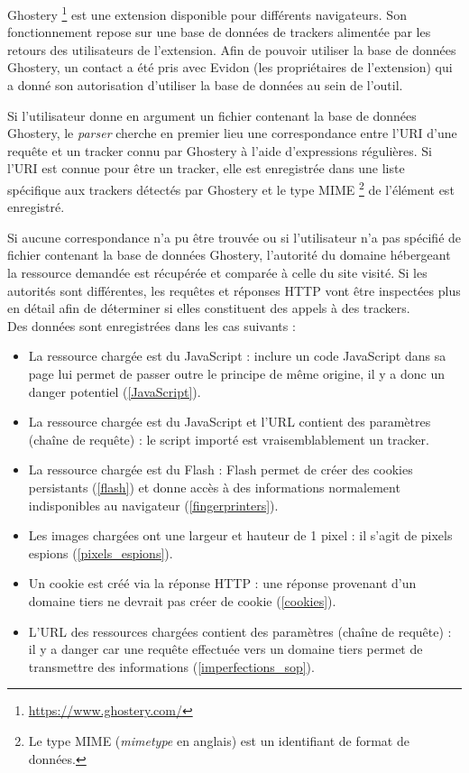 Ghostery \footnote{\url{https://www.ghostery.com/}} est une extension disponible pour différents navigateurs. Son fonctionnement repose sur une base de données de trackers alimentée par les retours des utilisateurs de l'extension.
Afin de pouvoir utiliser la base de données Ghostery, un contact a été pris avec Evidon (les propriétaires de l'extension) qui a donné son autorisation d'utiliser la base de données au sein de l'outil.
\newline

Si l'utilisateur donne en argument un fichier contenant la base de données Ghostery, le \textit{parser} cherche en premier lieu une correspondance entre l'URI d'une requête et un tracker connu par Ghostery à l'aide d'expressions régulières. Si l'URI est connue pour être un tracker, elle est enregistrée dans une liste spécifique aux trackers détectés par Ghostery et le type MIME \footnote{Le type MIME (\textit{mimetype} en anglais) est un identifiant de format de données.} de l'élément est enregistré.

Si aucune correspondance n'a pu être trouvée ou si l'utilisateur n'a pas spécifié de fichier contenant la base de données Ghostery, l'autorité du domaine hébergeant la ressource demandée est récupérée et comparée à celle du site visité. Si les autorités sont différentes, les requêtes et réponses HTTP vont être inspectées plus en détail afin de déterminer si elles constituent des appels à des trackers.\\
Des données sont enregistrées dans les cas suivants :
\begin{itemize}
	\item La ressource chargée est du JavaScript : inclure un code JavaScript dans sa page lui permet de passer outre le principe de même origine, il y a donc un danger potentiel (\autoref{JavaScript}).
	\item La ressource chargée est du JavaScript et l'URL contient des paramètres (chaîne de requête) : le script importé est vraisemblablement un tracker.
	\item La ressource chargée est du Flash : Flash permet de créer des cookies persistants (\autoref{flash}) et donne accès à des informations normalement indisponibles au navigateur (\autoref{fingerprinters}).
	\item Les images chargées ont une largeur et hauteur de 1 pixel : il s'agit de pixels espions (\autoref{pixels_espions}).
	\item Un cookie est créé via la réponse HTTP : une réponse provenant d'un domaine tiers ne devrait pas créer de cookie (\autoref{cookies}).
	\item L'URL des ressources chargées contient des paramètres (chaîne de requête) : il y a danger car une requête effectuée vers un domaine tiers permet de transmettre des informations (\autoref{imperfections_sop}).
	\newline
\end{itemize}

